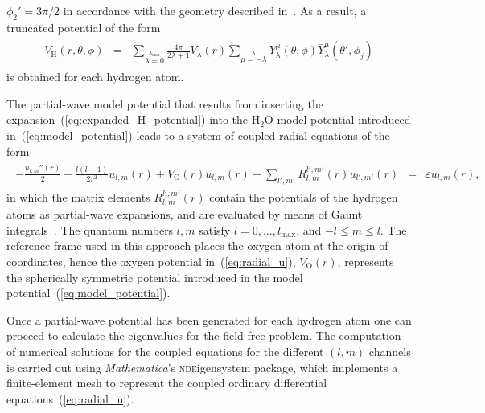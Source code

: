 $\phi_{2}'=3\pi/2$ in accordance with the geometry described
in~\cite{Moccia_1964}. As a result, a truncated potential of the
form~\cite{marko_partialwave}
%
\begin{eqnarray}
  \begin{split}
    V_{\mathrm{H}}(r,\theta,\phi) & = & \sum\limits_{\lambda=0}
    \limits^{\lambda_{\mathrm{max}}} \frac{4\pi}{2\lambda + 1} V_{\lambda}(r)
    \sum\limits_{\mu=-\lambda}\limits^{\lambda} Y_{\lambda}^{\mu}(\theta,\phi)
    \bar{Y}_{\lambda}^{\mu}(\theta',\phi_{j})
  \end{split}
  \label{eq:expanded_H_potential}
\end{eqnarray}
%
is obtained for each hydrogen atom. 


The partial-wave model potential that results from inserting the
expansion~(\ref{eq:expanded_H_potential}) into the H$_{2}$O model
potential introduced in~(\ref{eq:model_potential}) leads to a system
of coupled radial equations of the form~\cite{marko_partialwave}
%
\begin{eqnarray}
  \begin{split}
    -\frac{u_{l,m}''(r)}{2} + \frac{l(l + 1)}{2r^{2}} u_{l,m}(r)
    + V_{\mathrm{O}}(r) u_{l,m}(r) + \sum\limits_{l',m'}
    R_{l,m}^{l',m'}(r) u_{l',m'}(r) & = & \varepsilon u_{l,m}(r),
  \end{split}
  \label{eq:radial_u}
\end{eqnarray}
%
in which the matrix elements $R_{l,m}^{l',m'}(r)$ contain the
potentials of the hydrogen atoms as partial-wave expansions, and are
evaluated by means of Gaunt integrals~\cite{marko_partialwave}. The
quantum numbers $l,m$ satisfy $l = 0, \dots, l_{\mathrm{max}}$, and
$-l \leq m \leq l$. The reference frame used in this approach places
the oxygen atom at the origin of coordinates, hence the oxygen
potential in~(\ref{eq:radial_u}), $V_{\mathrm{O}}(r)$, represents the
spherically symmetric potential introduced in the model
potential~(\ref{eq:model_potential}).

Once a partial-wave potential has been generated for each hydrogen
atom one can proceed to calculate the eigenvalues for the field-free
problem. The computation of numerical solutions for the coupled
equations for the different $(l,m)$ channels is carried out using
\emph{Mathematica}'s \textsc{nde}igensystem package, which implements
a finite-element mesh to represent the coupled ordinary differential
equations~(\ref{eq:radial_u}).

